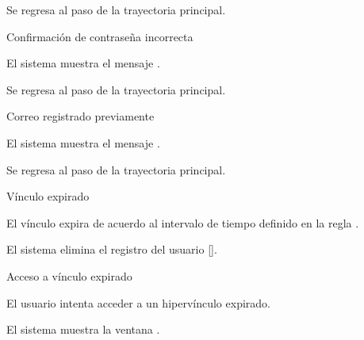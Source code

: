 {\begin{trayectoriaAlternativa}
    \item Se regresa al paso  de la trayectoria
      principal.

  \end{trayectoriaAlternativa}

  \begin{trayectoriaAlternativa}
    {Confirmación de contraseña incorrecta}

    \item El sistema muestra el mensaje
      .

    \item Se regresa al paso  de la trayectoria
      principal.

  \end{trayectoriaAlternativa}

  \begin{trayectoriaAlternativa}
    {Correo registrado previamente}

    \item El sistema muestra el mensaje
      .

    \item Se regresa al paso  de la trayectoria
      principal.

  \end{trayectoriaAlternativa}

  \begin{trayectoriaAlternativa}
    {Vínculo expirado}

    \item El vínculo expira de acuerdo al intervalo de tiempo definido
      en la regla .

    \item El sistema elimina el registro del usuario
      [].

  \end{trayectoriaAlternativa}

  \begin{trayectoriaAlternativa}
    {Acceso a vínculo expirado}

    \item El usuario intenta acceder a un hipervínculo expirado.

    \item El sistema muestra la ventana
      .

  \end{trayectoriaAlternativa}
}
